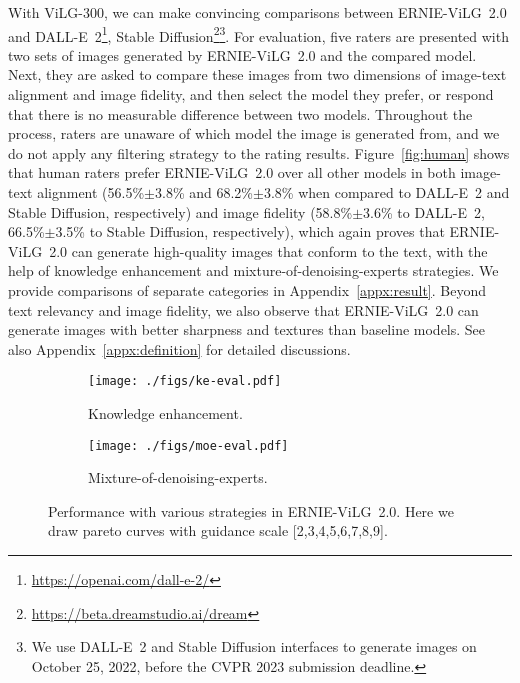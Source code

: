 \documentclass[10pt,twocolumn,letterpaper]{article}
\begin{document}
With ViLG-300, we can make convincing comparisons between ERNIE-ViLG~2.0 and DALL-E~2\footnote{\url{https://openai.com/dall-e-2/}}, Stable Diffusion\footnote{\url{https://beta.dreamstudio.ai/dream}}\footnote{We use DALL-E~2 and Stable Diffusion interfaces to generate images on October 25, 2022, before the CVPR 2023 submission deadline.}.
For evaluation, five raters are presented with two sets of images generated by ERNIE-ViLG~2.0 and the compared model.
Next, they are asked to compare these images from two dimensions of image-text alignment and image fidelity, and then select the model they prefer, or respond that there is no measurable difference between two models. 
Throughout the process, raters are unaware of which model the image is generated from, and we do not apply any filtering strategy to the rating results.
Figure~\ref{fig:human} shows that human raters prefer ERNIE-ViLG~2.0 over all other models in both image-text alignment (56.5\%$\pm$3.8\% and 68.2\%$\pm$3.8\% when compared to DALL-E~2 and Stable Diffusion, respectively) and image fidelity (58.8\%$\pm$3.6\% to DALL-E~2,  66.5\%$\pm$3.5\% to Stable Diffusion, respectively), which again proves that ERNIE-ViLG~2.0 can generate high-quality images that conform to the text, with the help of knowledge enhancement and mixture-of-denoising-experts strategies.
We provide comparisons of separate categories in Appendix~\ref{appx:result}.
Beyond text relevancy and image fidelity, we also observe that ERNIE-ViLG~2.0 can generate images with better sharpness and textures than baseline models. 
See also Appendix~\ref{appx:definition} for detailed discussions.

\begin{figure}
  \centering
  \begin{subfigure}{0.48\linewidth}
    \texttt{[image: ./figs/ke-eval.pdf]}
    \caption{Knowledge enhancement.}
    \label{fig:ke_eval}
  \end{subfigure}
  \begin{subfigure}{0.48\linewidth}
    \texttt{[image: ./figs/moe-eval.pdf]}
    \caption{Mixture-of-denoising-experts.}
    \label{fig:moe_eval}
  \end{subfigure}
  \caption{Performance with various strategies in ERNIE-ViLG~2.0. Here we draw pareto curves with guidance scale [2,3,4,5,6,7,8,9].}
  \label{fig:ablation}
\end{figure}
\end{document}
